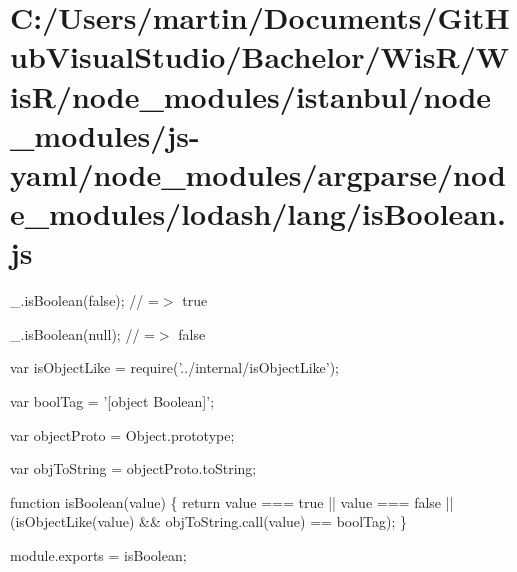 \hypertarget{_c_1_2_users_2martin_2_documents_2_git_hub_visual_studio_2_bachelor_2_wis_r_2_wis_r_2node_module4c02a065899017c79db2f6aaa4d5e42c}{}\section{C\+:/\+Users/martin/\+Documents/\+Git\+Hub\+Visual\+Studio/\+Bachelor/\+Wis\+R/\+Wis\+R/node\+\_\+modules/istanbul/node\+\_\+modules/js-\/yaml/node\+\_\+modules/argparse/node\+\_\+modules/lodash/lang/is\+Boolean.\+js}
\+\_\+.\+is\+Boolean(false); // =$>$ true

\+\_\+.\+is\+Boolean(null); // =$>$ false


\begin{DoxyCodeInclude}
var isObjectLike = require(\textcolor{stringliteral}{'../internal/isObjectLike'});

var boolTag = \textcolor{stringliteral}{'[object Boolean]'};

var objectProto = Object.prototype;

var objToString = objectProto.toString;

\textcolor{keyword}{function} isBoolean(value) \{
  \textcolor{keywordflow}{return} value === \textcolor{keyword}{true} || value === \textcolor{keyword}{false} || (isObjectLike(value) && objToString.call(value) == boolTag);
\}

module.exports = isBoolean;
\end{DoxyCodeInclude}
 